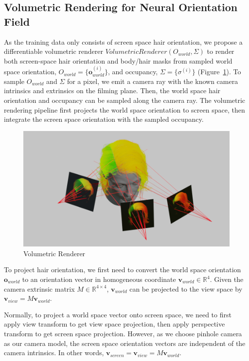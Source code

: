 \documentclass{article}
\begin{document}
\subsection{Volumetric Rendering for Neural Orientation Field}

As the training data only consists of screen space hair orientation, we propose a differentiable volumetric renderer $VolumetricRenderer(O_{world}, \Sigma)$ to render both screen-space hair orientation and body/hair masks from sampled world space orientation, $O_{world} = \{ \mathbf{o}_{world}^{(i)} \}$, and occupancy, $\Sigma = \{ \sigma^{(i)} \}$ (Figure~\ref{fig:volumetric-renderer}). To sample $O_{world}$ and $\Sigma$ for a pixel, we emit a camera ray with the known camera intrinsics and extrinsics on the filming plane. Then, the world space hair orientation and occupancy can be sampled along the camera ray. The volumetric rendering pipeline first projects the world space orientation to screen space, then integrate the screen space orientation with the sampled occupancy.

\begin{figure}
    \centering
    \includegraphics[width=0.9\linewidth]{./images/volumetric-renderer/volumetric-renderer.png}
    \caption{Volumetric Renderer}
    \label{fig:volumetric-renderer}
\end{figure}

To project hair orientation, we first need to convert the world space orientation $\mathbf{o}_{world}$ to an orientation vector in homogeneous coordinate $\mathbf{v}_{world} \in \mathbb{R}^{4}$. Given the camera extrinsic matrix $M \in \mathbb{R}^{4 \times 4}$, $\mathbf{v}_{world}$ can be projected to the view space by $\mathbf{v}_{view} = M\mathbf{v}_{world}$.

Normally, to project a world space vector onto screen space, we need to first apply view transform to get view space projection, then apply perspective transform to get screen space projection. However, as we choose pinhole camera as our camera model, the screen space orientation vectors are independent of the camera intrinsics. In other words, $\mathbf{v}_{screen} = \mathbf{v}_{view} = M\mathbf{v}_{world}$.
\end{document}
